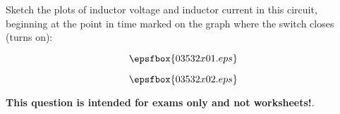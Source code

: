 

Sketch the plots of inductor voltage and inductor current in this circuit, beginning at the point in time marked on the graph where the switch closes (turns on):

$$\epsfbox{03532x01.eps}$$







$$\epsfbox{03532x02.eps}$$







{\bf This question is intended for exams only and not worksheets!}.



